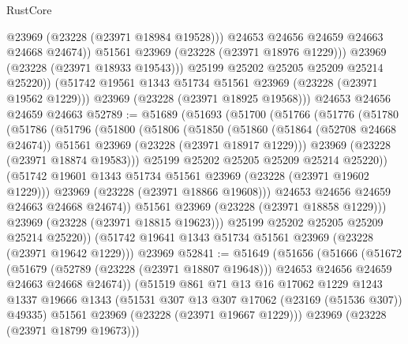 \begin{lexlean}{RustCore}
\begin{coremodule}
                    @23969
                    (@23228 (@23971 @18984 @19528)))
                  @24653
                  @24656
                  @24659
                  @24663
                  @24668
                  @24674))
              @51561
              @23969
              (@23228 (@23971 @18976 @1229)))
            @23969
            (@23228 (@23971 @18933 @19543)))
          @25199
          @25202
          @25205
          @25209
          @25214
          @25220))
      (@51742 @19561 @1343 @51734 @51561 @23969 (@23228 (@23971 @19562 @1229)))
      @23969
      (@23228 (@23971 @18925 @19568)))
    @24653
    @24656
    @24659
    @24663
@52789 := @51689
    (@51693
      (@51700
        (@51766
          (@51776
            (@51780
              (@51786
                (@51796
                  (@51800
                    (@51806
                      (@51850
                        (@51860
                          (@51864 (@52708 @24668 @24674))
                          @51561
                          @23969
                          (@23228 (@23971 @18917 @1229)))
                        @23969
                        (@23228 (@23971 @18874 @19583)))
                      @25199
                      @25202
                      @25205
                      @25209
                      @25214
                      @25220))
                  (@51742 @19601 @1343 @51734 @51561 @23969 (@23228 (@23971 @19602 @1229)))
                  @23969
                  (@23228 (@23971 @18866 @19608)))
                @24653
                @24656
                @24659
                @24663
                @24668
                @24674))
            @51561
            @23969
            (@23228 (@23971 @18858 @1229)))
          @23969
          (@23228 (@23971 @18815 @19623)))
        @25199
        @25202
        @25205
        @25209
        @25214
        @25220))
    (@51742 @19641 @1343 @51734 @51561 @23969 (@23228 (@23971 @19642 @1229)))
    @23969
@52841 := @51649
    (@51656
      (@51666
        (@51672
          (@51679
            (@52789 (@23228 (@23971 @18807 @19648)))
            @24653
            @24656
            @24659
            @24663
            @24668
            @24674))
        (@51519
          @861
          @71
          @13
          @16
          @17062
          @1229
          @1243
          @1337
          @19666
          @1343
          (@51531 @307 @13 @307 @17062 (@23169 (@51536 @307)) @49335)
          @51561
          @23969
          (@23228 (@23971 @19667 @1229)))
        @23969
        (@23228 (@23971 @18799 @19673)))

\end{coremodule}
\end{lexlean}
